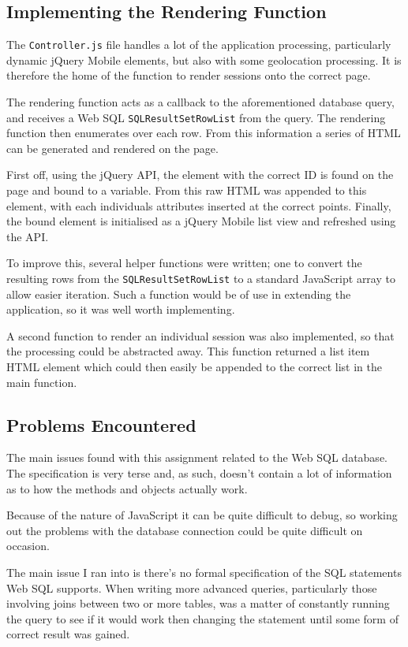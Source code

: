 \documentclass[11pt, a4paper]{article}
\begin{document}
\subsection{Implementing the Rendering Function}
The \texttt{Controller.js} file handles a lot of the application processing,
particularly dynamic jQuery Mobile elements, but also with some geolocation
processing. It is therefore the home of the function to render sessions onto
the correct page.

The rendering function acts as a callback to the aforementioned database query,
and receives a Web SQL \texttt{SQLResultSetRowList} from the query. The 
rendering function then enumerates over each row. From this information a 
series of HTML can be generated and rendered on the page.

First off, using the jQuery API, the element with the correct ID is found on 
the page and bound to a variable. From this raw HTML was appended to this
element, with each individuals attributes inserted at the correct points.
Finally, the bound element is initialised as a jQuery Mobile list view and
refreshed using the API.

To improve this, several helper functions were written; one to convert the
resulting rows from the \texttt{SQLResultSetRowList} to a standard JavaScript
array to allow easier iteration. Such a function would be of use in extending
the application, so it was well worth implementing.

A second function to render an individual session was also implemented, so that
the processing could be abstracted away. This function returned a list item 
HTML element which could then easily be appended to the correct list in the
main function.

\subsection{Problems Encountered}
The main issues found with this assignment related to the Web SQL database. The
specification is very terse and, as such, doesn't contain a lot of information
as to how the methods and objects actually work.

Because of the nature of JavaScript it can be quite difficult to debug, so
working out the problems with the database connection could be quite difficult
on occasion.

The main issue I ran into is there's no formal specification of the SQL
statements Web SQL supports. When writing more advanced queries, particularly
those involving joins between two or more tables, was a matter of constantly
running the query to see if it would work then changing the statement until
some form of correct result was gained.
\end{document}
